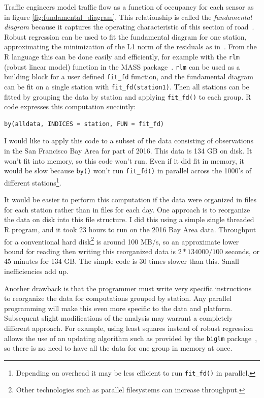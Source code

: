 \documentclass[12pt]{article}
\begin{document}
Traffic engineers model traffic flow as a function of occupancy for each
sensor as in figure \ref{fig:fundamental_diagram}. This relationship is
called the \emph{fundamental diagram} because it captures the operating
characteristic of this section of road~\cite{daganzo1997fundamentals}. 
Robust regression can be used to fit the fundamental diagram for one
station, approximating the minimization of the L1 norm of the residuals as
in~\cite{li2011fundamental}.  From the R language this can be done easily
and efficiently, for example with the \texttt{rlm} (robust linear model)
function in the MASS package~\cite{venables2013modern}. \texttt{rlm} can be
used as a building block for a user defined \texttt{fit\_fd} function, and
the fundamental diagram can be fit on a single station with
\texttt{fit\_fd(station1)}. Then all stations can be fitted
by grouping the data by station and
applying \texttt{fit\_fd()} to each group.
R code expresses this computation succintly:

\begin{verbatim}
by(alldata, INDICES = station, FUN = fit_fd)
\end{verbatim}

I would like to apply this code to a subset of the data consisting of
observations in the San Francisco Bay Area for part of 2016.  This data is
134 GB on disk. It won't fit into memory, so this code won't run.  Even
if it did fit in memory, it would be slow because \texttt{by()} won't run
\texttt{fit\_fd()} in parallel across the 1000's of different
stations\footnote{ Depending on overhead it may be less efficient to run
\texttt{fit\_fd()} in parallel.}.

It would be easier to perform this computation if the data were
organized in files for each station rather than in files for each day.  One
approach is to reorganize the data on disk into this file structure. I
did this using a simple single threaded R program, and it took 23 hours to
run on the 2016 Bay Area data.  Throughput for a conventional hard
disk\footnote{Other technologies such as parallel filesystems can increase
throughput.} is around 100 MB/s, so an approximate lower bound for reading
then writing this reorganized data is $2 * 134000 / 100$ seconds, or 45
minutes for 134 GB.  The simple code is 30 times slower than this. Small
inefficiencies add up.

Another drawback is that the programmer must write very specific
instructions to reorganize the data for computations grouped by station.
Any parallel programming will make this even more specific to the data and
platform. Subsequent slight modifications of the analysis may warrant a
completely different approach. For example, using least squares instead of
robust regression allows the use of an updating algorithm such as provided
by the \texttt{biglm} package~\cite{R-biglm}, so there is no need to have
all the data for one group in memory at once.
\end{document}
